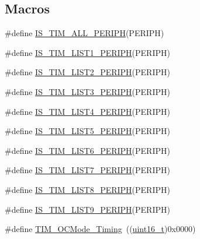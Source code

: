 \subsection*{Macros}
\begin{DoxyCompactItemize}
\item 
\#define \hyperlink{group___t_i_m___exported__constants_ga71710da28a59c007a1d2ddee18a5ffcc}{I\+S\+\_\+\+T\+I\+M\+\_\+\+A\+L\+L\+\_\+\+P\+E\+R\+I\+PH}(P\+E\+R\+I\+PH)
\item 
\#define \hyperlink{group___t_i_m___exported__constants_ga1abea04e3837b7683d8e8dc33441677f}{I\+S\+\_\+\+T\+I\+M\+\_\+\+L\+I\+S\+T1\+\_\+\+P\+E\+R\+I\+PH}(P\+E\+R\+I\+PH)
\item 
\#define \hyperlink{group___t_i_m___exported__constants_ga3c489ac3294f0d8f2ec097da909bc8e0}{I\+S\+\_\+\+T\+I\+M\+\_\+\+L\+I\+S\+T2\+\_\+\+P\+E\+R\+I\+PH}(P\+E\+R\+I\+PH)
\item 
\#define \hyperlink{group___t_i_m___exported__constants_ga2d80541c542755ac3f2aca078bd98adb}{I\+S\+\_\+\+T\+I\+M\+\_\+\+L\+I\+S\+T3\+\_\+\+P\+E\+R\+I\+PH}(P\+E\+R\+I\+PH)
\item 
\#define \hyperlink{group___t_i_m___exported__constants_ga9c2699fd3d0c0901f8ac706c3d2dfe10}{I\+S\+\_\+\+T\+I\+M\+\_\+\+L\+I\+S\+T4\+\_\+\+P\+E\+R\+I\+PH}(P\+E\+R\+I\+PH)
\item 
\#define \hyperlink{group___t_i_m___exported__constants_ga90232c3966a578fbd9be2b228f225cb4}{I\+S\+\_\+\+T\+I\+M\+\_\+\+L\+I\+S\+T5\+\_\+\+P\+E\+R\+I\+PH}(P\+E\+R\+I\+PH)
\item 
\#define \hyperlink{group___t_i_m___exported__constants_ga99fabffbddc9ca930f80a4480daeecbe}{I\+S\+\_\+\+T\+I\+M\+\_\+\+L\+I\+S\+T6\+\_\+\+P\+E\+R\+I\+PH}(P\+E\+R\+I\+PH)
\item 
\#define \hyperlink{group___t_i_m___exported__constants_ga421bba71d6e8fbe9a9d422ecd59e79be}{I\+S\+\_\+\+T\+I\+M\+\_\+\+L\+I\+S\+T7\+\_\+\+P\+E\+R\+I\+PH}(P\+E\+R\+I\+PH)
\item 
\#define \hyperlink{group___t_i_m___exported__constants_ga120d98895bd48d628028753212b68233}{I\+S\+\_\+\+T\+I\+M\+\_\+\+L\+I\+S\+T8\+\_\+\+P\+E\+R\+I\+PH}(P\+E\+R\+I\+PH)
\item 
\#define \hyperlink{group___t_i_m___exported__constants_ga24ff46311f2d074ec6bd93f2972d1d9b}{I\+S\+\_\+\+T\+I\+M\+\_\+\+L\+I\+S\+T9\+\_\+\+P\+E\+R\+I\+PH}(P\+E\+R\+I\+PH)
\item 
\#define \hyperlink{group___t_i_m___output___compare__and___p_w_m__modes_ga54d5745fade3b2f8ea1325e7447ca760}{T\+I\+M\+\_\+\+O\+C\+Mode\+\_\+\+Timing}~((\hyperlink{_p_e___types_8h_a1f1825b69244eb3ad2c7165ddc99c956}{uint16\+\_\+t})0x0000)

\end{DoxyCompactItemize}
